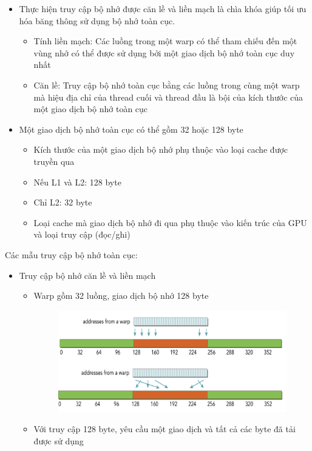 \documentclass[14pt, a4paper]{article}
\numberwithin{equation}{section}
\numberwithin{figure}{section}
\numberwithin{dl}{section}
\numberwithin{md}{section}
\numberwithin{bd}{section}
\numberwithin{dn}{section}
\numberwithin{hq}{section}
\begin{document}
\begin{itemize}
    \item Thực hiện truy cập bộ nhớ được căn lề và liền mạch là chìa khóa giúp tối ưu hóa băng thông sử dụng bộ nhớ toàn cục.
    \begin{itemize}
        \item Tính liền mạch: Các luồng trong một warp có thể tham chiếu đến một vùng nhớ có thể được sử dụng bởi một giao dịch bộ nhớ toàn cục duy nhất
        \item Căn lề: Truy cập bộ nhớ toàn cục bằng các luồng trong cùng một warp mà hiệu địa chỉ của thread cuối và thread đầu là bội của kích thước của một giao dịch bộ nhớ toàn cục
    \end{itemize}
\end{itemize}

\begin{itemize}
    \item Một giao dịch bộ nhớ toàn cục có thể gồm 32 hoặc 128 byte
    \begin{itemize}
        \item Kích thước của một giao dịch bộ nhớ phụ thuộc vào loại cache được truyền qua
        \item Nếu L1 và L2: 128 byte
        \item Chỉ L2: 32 byte
        \item Loại cache mà giao dịch bộ nhớ đi qua phụ thuộc vào kiến trúc của GPU và loại truy cập (đọc/ghi)
    \end{itemize}
\end{itemize}

Các mẫu truy cập bộ nhớ toàn cục:

\begin{itemize}
    \item Truy cập bộ nhớ căn lề và liền mạch
    \begin{itemize}
        \item Warp gồm 32 luồng, giao dịch bộ nhớ 128 byte
        \begin{figure}[H]
            \centering
            \includegraphics[width=0.7\linewidth]{figures/CUDA/Aligned_Coalesced_Global_Memory_Transaction.png}
        \end{figure}
        \item Với truy cập 128 byte, yêu cầu một giao dịch và tất cả các byte đã tải được sử dụng
    \end{itemize}
\end{itemize}
\end{document}
